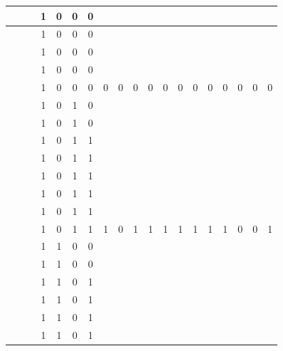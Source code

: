 \begin{table}[!tb]
\begin{tabular}{|c|c|c|c|c|c|c|c|c|c|c|c|c|c|c|c|c|c|c|}
        \rowcolor{yellow!40}  &  &  & 1 & 0 & 0 & 0 &  &  &  &  &  &  &  &  &  &  &  &  \\ \hline
        \rowcolor{yellow!40}  &  &  & 1 & 0 & 0 & 0 &  &  &  &  &  &  &  &  &  &  &  &  \\ \hline
        \rowcolor{yellow!40}  &  &  & 1 & 0 & 0 & 0 &  &  &  &  &  &  &  &  &  &  &  &  \\ \hline
        \rowcolor{yellow!40}  &  &  & 1 & 0 & 0 & 0 &  &  &  &  &  &  &  &  &  &  &  &  \\ \hline
        \rowcolor{yellow!40}  &  &  & 1 & 0 & 0 & 0 & 0 & 0 & 0 & 0 & 0 & 0 & 0 & 0 & 0 & 0 & 0 & 0 \\ \hline
        \rowcolor{gray!40}  &  &  & 1 & 0 & 1 & 0 &  &  &  &  &  &  &  &  &  &  &  &  \\ \hline
        \rowcolor{gray!40}  &  &  & 1 & 0 & 1 & 0 &  &  &  &  &  &  &  &  &  &  &  &  \\ \hline
        \rowcolor{gray!40}  &  &  & 1 & 0 & 1 & 1 &  &  &  &  &  &  &  &  &  &  &  &  \\ \hline
        \rowcolor{gray!40}  &  &  & 1 & 0 & 1 & 1 &  &  &  &  &  &  &  &  &  &  &  &  \\ \hline
        \rowcolor{gray!40}  &  &  & 1 & 0 & 1 & 1 &  &  &  &  &  &  &  &  &  &  &  &  \\ \hline
        \rowcolor{gray!40}  &  &  & 1 & 0 & 1 & 1 &  &  &  &  &  &  &  &  &  &  &  &  \\ \hline
        \rowcolor{gray!40}  &  &  & 1 & 0 & 1 & 1 &  &  &  &  &  &  &  &  &  &  &  &  \\ \hline
        \rowcolor{gray!40}  &  &  & 1 & 0 & 1 & 1 & 1 & 0 & 1 & 1 & 1 & 1 & 1 & 1 & 1 & 0 & 0 & 1 \\ \hline
        \rowcolor{blue!40}  &  &  & 1 & 1 & 0 & 0 &  &  &  &  &  &  &  &  &  &  &  &  \\ \hline
        \rowcolor{blue!40}  &  &  & 1 & 1 & 0 & 0 &  &  &  &  &  &  &  &  &  &  &  &  \\ \hline
        \rowcolor{blue!40}  &  &  & 1 & 1 & 0 & 1 &  &  &  &  &  &  &  &  &  &  &  &  \\ \hline
        \rowcolor{blue!40}  &  &  & 1 & 1 & 0 & 1 &  &  &  &  &  &  &  &  &  &  &  &  \\ \hline
        \rowcolor{blue!40}  &  &  & 1 & 1 & 0 & 1 &  &  &  &  &  &  &  &  &  &  &  &  \\ \hline
        \rowcolor{blue!40}  &  &  & 1 & 1 & 0 & 1 &  &  &  &  &  &  &  &  &  &  &  &  \\ \hline

\end{tabular}
\end{table}
